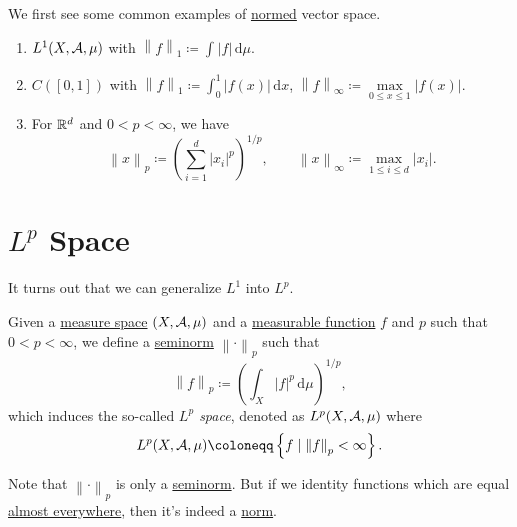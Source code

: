 \begin{eg}
	We first see some common examples of \hyperref[def:norm]{normed} vector space.
	\begin{enumerate}[(1)]
		\item \(L^1(X, \mathcal{\MakeUppercase{a}}  , \mu )\) with \(\left\lVert f\right\rVert _1 \coloneqq \int_{}^{} \left\vert f \right\vert  \,\mathrm{d}\mu  \).
		\item \(C([0, 1])\) with \(\left\lVert f\right\rVert _1 \coloneqq \int_{0}^{1} \left\vert f(x) \right\vert  \,\mathrm{d}x \), \(\left\lVert f\right\rVert _\infty \coloneqq \mathop{\max}\limits_{0\leq x\leq 1}\left\vert f(x) \right\vert \).
		\item For \(\mathbb{\MakeUppercase{r}} ^d\) and \(0 < p < \infty \), we have
		      \[
			      \left\lVert x\right\rVert _p \coloneqq \left(\sum\limits_{i=1}^{d} \left\vert x_{i}  \right\vert^p \right)^{1/p},\qquad \left\lVert x\right\rVert _\infty \coloneqq \mathop{\max} _{1\leq i\leq d}\left\vert x_{i}  \right\vert.
		      \]
	\end{enumerate}
\end{eg}

\section{\(L^{p} \) Space}
It turns out that we can generalize \hyperref[def:L1-space]{\(L^1\)} into \(L^p\).
\begin{definition}[\(L^p\) space]\label{def:L-p-space}
	Given a \hyperref[def:measure-space]{measure space} \((X, \mathcal{\MakeUppercase{a}} , \mu )\) and a \hyperref[def:measurable-function]{measurable function} \(f\) and \(p\) such that
	\(0 < p < \infty \), we define a \hyperref[def:seminorm]{seminorm} \(\left\lVert \cdot\right\rVert _p\) such that
	\[
		\left\lVert f\right\rVert _p \coloneqq \left(\int _X \left\vert f \right\vert ^p \,\mathrm{d} \mu \right)^{1/p},
	\]
	which induces the so-called \emph{\(L^p\) space}, denoted as \(L^p(X, \mathcal{\MakeUppercase{a}} , \mu )\) where
	\[
		L^p(X, \mathcal{\MakeUppercase{a}} , \mu ) \coloneqq \left\{f\mid \left\lVert f\right\rVert _p < \infty \right\}.
	\]
\end{definition}
\begin{remark}
	Note that \(\left\lVert \cdot\right\rVert _p\) is only a \hyperref[def:seminorm]{seminorm}. But if we identity functions which are equal \hyperref[def:mu-almost-everywhere]{almost everywhere},
	then it's indeed a \hyperref[def:norm]{norm}.
\end{remark}

